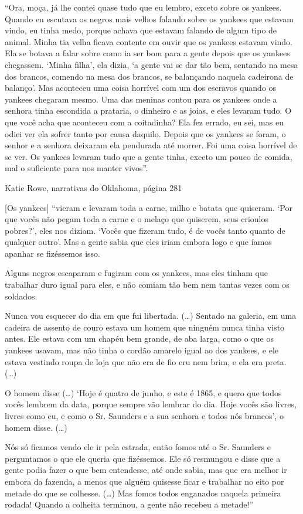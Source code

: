 ``Ora, moça, já lhe contei quase tudo que eu lembro, exceto sobre os
yankees. Quando eu escutava os negros mais velhos falando sobre os
yankees que estavam vindo, eu tinha medo, porque achava que estavam
falando de algum tipo de animal. Minha tia velha ficava contente em
ouvir que os yankees estavam vindo. Ela se botava a falar sobre como ia
ser bom para a gente depois que os yankees chegassem. `Minha filha', ela
dizia, `a gente vai se dar tão bem, sentando na mesa dos brancos,
comendo na mesa dos brancos, se balançando naquela cadeirona de
balanço'. Mas aconteceu uma coisa horrível com um dos escravos quando os
yankees chegaram mesmo. Uma das meninas contou para os yankees onde a
senhora tinha escondida a prataria, o dinheiro e as joias, e eles
levaram tudo. O que você acha que aconteceu com a coitadinha? Ela fez
errado, eu sei, mas eu odiei ver ela sofrer tanto por causa daquilo.
Depois que os yankees se foram, o senhor e a senhora deixaram ela
pendurada até morrer. Foi uma coisa horrível de se ver. Os yankees
levaram tudo que a gente tinha, exceto um pouco de comida, mal o
suficiente para nos manter vivos''.

Katie Rowe, narrativas do Oklahoma, página 281

{[}Os yankees{]} ``vieram e levaram toda a carne, milho e batata que
quiseram. `Por que vocês não pegam toda a carne e o melaço que quiserem,
seus crioulos pobres?', eles nos diziam. `Vocês que fizeram tudo, é de
vocês tanto quanto de qualquer outro'. Mas a gente sabia que eles iriam
embora logo e que íamos apanhar se fizéssemos isso.

Alguns negros escaparam e fugiram com os yankees, mas eles tinham que
trabalhar duro igual para eles, e não comiam tão bem nem tantas vezes
com os soldados.

Nunca vou esquecer do dia em que fui libertada. (\ldots{}) Sentado na
galeria, em uma cadeira de assento de couro estava um homem que ninguém
nunca tinha visto antes. Ele estava com um chapéu bem grande, de aba
larga, como o que os yankees usavam, mas não tinha o cordão amarelo
igual ao dos yankees, e ele estava vestindo roupa de loja que não era de
fio cru nem brim, e ela era preta. (\ldots{})

O homem disse (\ldots{}) `Hoje é quatro de junho, e este é 1865, e quero
que todos vocês lembrem da data, porque sempre vão lembrar do dia. Hoje
vocês são livres, livres como eu, e como o Sr. Saunders e a sua senhora
e todos nós brancos', o homem disse. (\ldots{})

Nós só ficamos vendo ele ir pela estrada, então fomos até o Sr. Saunders
e perguntamos o que ele queria que fizéssemos. Ele só resmungou e disse
que a gente podia fazer o que bem entendesse, até onde sabia, mas que
era melhor ir embora da fazenda, a menos que alguém quisesse ficar e
trabalhar no eito por metade do que se colhesse. (\ldots{}) Mas fomos
todos enganados naquela primeira rodada! Quando a colheita terminou, a
gente não recebeu a metade!''


